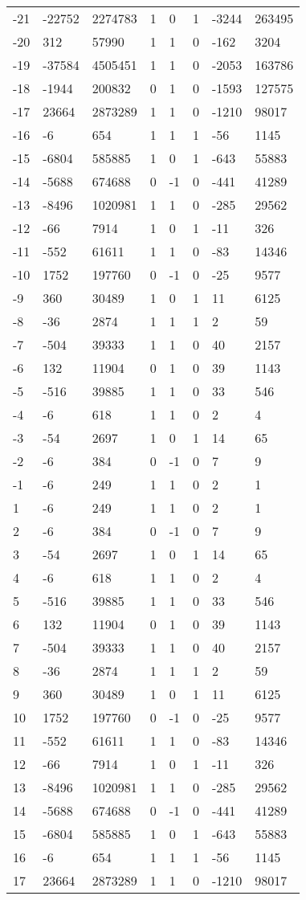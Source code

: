 \documentclass{amsart}
\begin{document}
\begin{longtable}{|l|l|l|lllll|}
-21&-22752&2274783&1&0&1&-3244&263495\\
-20&312&57990&1&1&0&-162&3204\\
-19&-37584&4505451&1&1&0&-2053&163786\\
-18&-1944&200832&0&1&0&-1593&127575\\
-17&23664&2873289&1&1&0&-1210&98017\\
-16&-6&654&1&1&1&-56&1145\\
-15&-6804&585885&1&0&1&-643&55883\\
-14&-5688&674688&0&-1&0&-441&41289\\
-13&-8496&1020981&1&1&0&-285&29562\\
-12&-66&7914&1&0&1&-11&326\\
-11&-552&61611&1&1&0&-83&14346\\
-10&1752&197760&0&-1&0&-25&9577\\
-9&360&30489&1&0&1&11&6125\\
-8&-36&2874&1&1&1&2&59\\
-7&-504&39333&1&1&0&40&2157\\
-6&132&11904&0&1&0&39&1143\\
-5&-516&39885&1&1&0&33&546\\
-4&-6&618&1&1&0&2&4\\
-3&-54&2697&1&0&1&14&65\\
-2&-6&384&0&-1&0&7&9\\
-1&-6&249&1&1&0&2&1\\
1&-6&249&1&1&0&2&1\\
2&-6&384&0&-1&0&7&9\\
3&-54&2697&1&0&1&14&65\\
4&-6&618&1&1&0&2&4\\
5&-516&39885&1&1&0&33&546\\
6&132&11904&0&1&0&39&1143\\
7&-504&39333&1&1&0&40&2157\\
8&-36&2874&1&1&1&2&59\\
9&360&30489&1&0&1&11&6125\\
10&1752&197760&0&-1&0&-25&9577\\
11&-552&61611&1&1&0&-83&14346\\
12&-66&7914&1&0&1&-11&326\\
13&-8496&1020981&1&1&0&-285&29562\\
14&-5688&674688&0&-1&0&-441&41289\\
15&-6804&585885&1&0&1&-643&55883\\
16&-6&654&1&1&1&-56&1145\\
17&23664&2873289&1&1&0&-1210&98017\\

\end{longtable}
\end{document}
